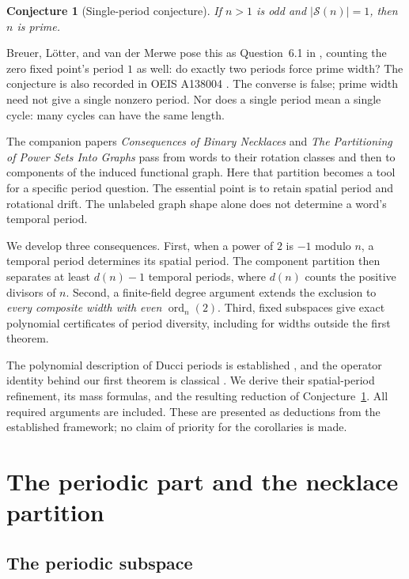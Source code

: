 \documentclass[11pt]{article}
\newtheorem{conjecture}[theorem]{Conjecture}
\theoremstyle{definition}
\theoremstyle{remark}
\numberwithin{equation}{section}
\newcommand{\Spec}{\mathcal S}
\DeclareMathOperator{\ord}{ord}
\begin{document}
\begin{conjecture}[Single-period conjecture]\label{conj:single}
If $n>1$ is odd and $|\Spec(n)|=1$, then $n$ is prime.
\end{conjecture}

Breuer, L\"otter, and van der Merwe pose this as Question~6.1
in \cite{BLM}, counting the zero fixed point's period $1$ as well: do exactly two periods
force prime width? The conjecture is also recorded in OEIS A138004
\cite{OEIS}. The converse is false; prime width need not give a single
nonzero period. Nor does a single period mean a single cycle: many cycles
can have the same length.

The companion papers \emph{Consequences of Binary Necklaces}
\cite{Introduction} and \emph{The Partitioning of Power Sets Into Graphs}
\cite{Partition} pass from words to their rotation classes and then to
components of the induced functional graph. Here that partition becomes
a tool for a specific period question. The essential point is to retain
spatial period and rotational drift. The unlabeled graph shape alone does
not determine a word's temporal period.

We develop three consequences. First, when a power of $2$ is $-1$ modulo
$n$, a temporal period determines its spatial period. The component
partition then separates at least $d(n)-1$ temporal periods, where $d(n)$
counts the positive divisors of $n$. Second, a finite-field degree argument
extends the exclusion to \emph{every composite width with even}
$\ord_n(2)$. Third, fixed subspaces give exact polynomial certificates of
period diversity, including for widths outside the first theorem.

The polynomial description of Ducci periods is established
\cite[Theorems~3.7 and~3.9]{BLM}, and the operator identity behind our first
theorem is classical \cite[proof of Theorem~2]{Ehrlich}. We derive their
spatial-period refinement, its mass formulas, and the resulting reduction
of Conjecture~\ref{conj:single}. All required arguments are included.
These are presented as deductions from the established framework; no
claim of priority for the corollaries is made.

\section{The periodic part and the necklace partition}\label{sec:setup}

\subsection{The periodic subspace}
\end{document}
